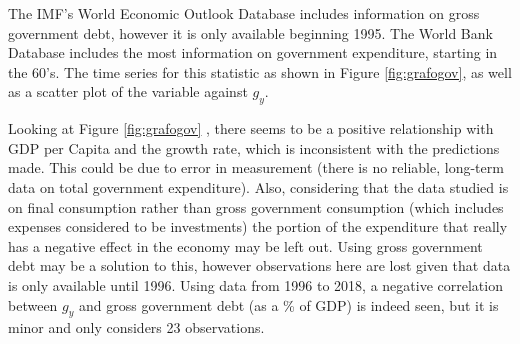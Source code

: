 \documentclass[12pt,twoside,a4paper]{article}
\numberwithin{equation}{section}
\begin{document}
The IMF's World Economic Outlook Database includes information on gross government debt, however it is only available beginning 1995. The World Bank Database includes the most information on government expenditure, starting in the 60's. The time series for this statistic as shown in Figure \ref{fig:grafogov}, as well as a scatter plot of the variable against $g_y$.
\begin{figure}[H]
\end{figure}

Looking at Figure \ref{fig:grafogov} , there seems to be a positive relationship with GDP per Capita and the growth rate, which is inconsistent with the predictions made. This could be due to error in measurement (there is no reliable, long-term data on total government expenditure). Also, considering that the data studied is on final consumption rather than gross government consumption (which includes expenses considered to be investments) the portion of the expenditure that really has a negative effect in the economy may be left out. Using gross government debt may be a solution to this, however observations here are lost given that data is only available until 1996. Using data from 1996 to 2018, a negative correlation between $g_y$ and gross government debt (as a \% of GDP) is indeed seen, but it is minor and only considers 23 observations. 
\end{document}
